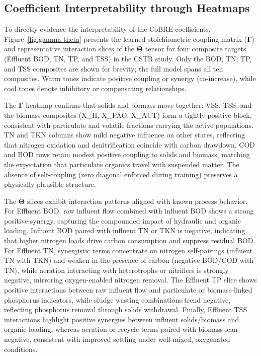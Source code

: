 \documentclass{article}
\begin{document}
\subsection{Coefficient Interpretability through Heatmaps}

To directly evidence the interpretability of the CoBRE coefficients, Figure~\ref{fig:gamma-theta} presents the learned stoichiometric coupling matrix ($\mathbf{\Gamma}$) and representative interaction slices of the $\mathbf{\Theta}$ tensor for four composite targets (Effluent BOD, TN, TP, and TSS) in the CSTR study. Only the BOD, TN, TP, and TSS composites are shown for brevity; the full model spans all ten composites. Warm tones indicate positive coupling or synergy (co-increase), while cool tones denote inhibitory or compensating relationships.

The $\mathbf{\Gamma}$ heatmap confirms that solids and biomass move together: VSS, TSS, and the biomass composites (X\_H, X\_PAO, X\_AUT) form a tightly positive block, consistent with particulate and volatile fractions carrying the active populations. TN and TKN columns show mild negative influence on other states, reflecting that nitrogen oxidation and denitrification coincide with carbon drawdown. COD and BOD rows retain modest positive coupling to solids and biomass, matching the expectation that particulate organics travel with suspended matter. The absence of self-coupling (zero diagonal enforced during training) preserves a physically plausible structure.

The $\mathbf{\Theta}$ slices exhibit interaction patterns aligned with known process behavior. For Effluent BOD, raw influent flow combined with influent BOD shows a strong positive synergy, capturing the compounded impact of hydraulic and organic loading. Influent BOD paired with influent TN or TKN is negative, indicating that higher nitrogen loads drive carbon consumption and suppress residual BOD. For Effluent TN, synergistic terms concentrate on nitrogen self-pairings (influent TN with TKN) and weaken in the presence of carbon (negative BOD/COD with TN), while aeration interacting with heterotrophs or nitrifiers is strongly negative, mirroring oxygen-enabled nitrogen removal. The Effluent TP slice shows positive interactions between raw influent flow and particulate or biomass-linked phosphorus indicators, while sludge wasting combinations trend negative, reflecting phosphorus removal through solids withdrawal. Finally, Effluent TSS interactions highlight positive synergies between influent solids/biomass and organic loading, whereas aeration or recycle terms paired with biomass lean negative, consistent with improved settling under well-mixed, oxygenated conditions.
\end{document}
